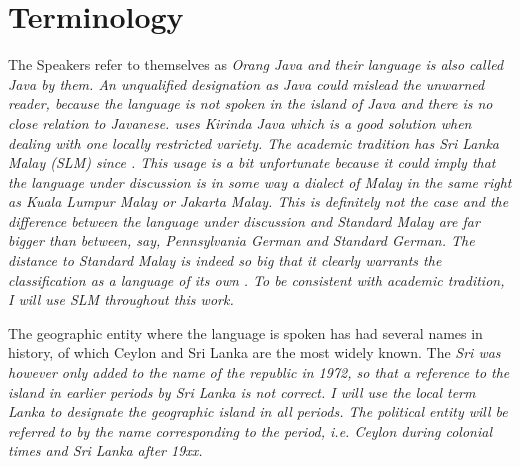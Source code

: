 \section{Terminology}
The Speakers refer to themselves as \em Orang Java \em and their language is also called \em Java \em by them. An unqualified designation as \em Java \em could mislead the unwarned reader, because the language is not spoken in the island of Java and there is no close relation to Javanese. \citet{Ansaldo2005kirinda} uses \em Kirinda Java \em which is a good solution when dealing with one locally restricted variety. The academic tradition has Sri Lanka Malay (SLM) since \citet{Smith1979}. This usage is a bit unfortunate because it could imply that the language under discussion is in some way a dialect of Malay in the same right as Kuala Lumpur Malay or Jakarta Malay. This is definitely not the case and the difference between the language under discussion and Standard Malay are far bigger than between, say, Pennsylvania German and Standard German. The distance to Standard Malay is indeed so big that it clearly warrants the classification as a language of its own \citep{Adelaar1991}. To be consistent with academic tradition, I will use SLM throughout this work.

The geographic entity where the language is spoken has had several names in history, of which Ceylon and Sri Lanka are the most widely known. The \em Sri \em was however only added to the name of the republic in 1972, so that a reference to the island in earlier periods by \em Sri Lanka \em is not correct. I will use the local term \em Lanka \em to designate the geographic island in all periods. The political entity will be referred to by the name corresponding to the period, i.e. \em Ceylon \em during colonial times and \em Sri Lanka \em after 19xx.


